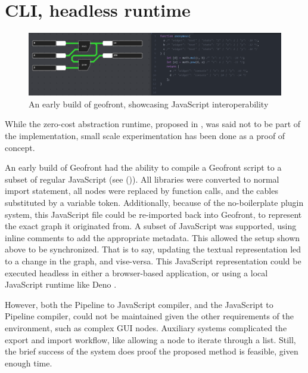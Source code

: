 
\section{CLI, headless runtime}

\begin{figure}
  \centering
  \graphicspath{ {../../assets/images/implementation/} }
  \includegraphics[width=\linewidth]{early-geofront.png}
  \caption[Geofront to js]{An early build of geofront, showcasing JavaScript interoperability }
  \label{fig:early-geofront-compile-to-js}
\end{figure}

While the zero-cost abstraction runtime, proposed in , was said not to be part of the implementation, small scale experimentation has been done as a proof of concept. 

An early build of Geofront had the ability to compile a Geofront script to a subset of regular JavaScript (see ()).  
All libraries were converted to normal import statement, all nodes were replaced by function calls, and the cables substituted by a variable token. 
Additionally, because of the no-boilerplate plugin system, this JavaScript file could be re-imported back into Geofront, to represent the exact graph it originated from. 
A subset of JavaScript was supported, using inline comments to add the appropriate metadata.
This allowed the setup shown above to be synchronized.
That is to say, updating the textual representation led to a change in the graph, and vise-versa.
This JavaScript representation could be executed headless in either a browser-based application, or using a local JavaScript runtime like Deno \citep{contributors_deno_2022}.

However, both the Pipeline to JavaScript compiler, and the JavaScript to Pipeline compiler, could not be maintained given the other requirements of the environment, such as complex \ac{GUI} nodes.
Auxiliary systems complicated the export and import workflow, like allowing a node to iterate through a list. 
Still, the brief success of the system does proof the proposed method is feasible, given enough time.